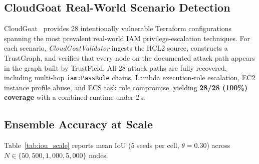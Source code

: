 \documentclass[conference,a4paper]{IEEEtran}
\begin{document}
\subsection{CloudGoat Real-World Scenario Detection}

CloudGoat~\cite{rhino_cloudgoat} provides 28 intentionally vulnerable
Terraform configurations spanning the most prevalent real-world IAM
privilege-escalation techniques. For each scenario,
\textit{CloudGoatValidator} ingests the HCL2 source, constructs a
TrustGraph, and verifies that every node on the documented attack path
appears in the graph built by TrustField. All 28 attack paths are fully
recovered, including multi-hop \texttt{iam:PassRole} chains, Lambda
execution-role escalation, EC2 instance profile abuse, and ECS task role
compromise, yielding \textbf{28/28 (100\%) coverage} with a combined
runtime under 2\,s.

\subsection{Ensemble Accuracy at Scale}

Table~\ref{tab:iou_scale} reports mean IoU (5 seeds per cell,
$\theta{=}0.30$) across $N\in\{50,500,1{,}000,5{,}000\}$ nodes.
\end{document}

